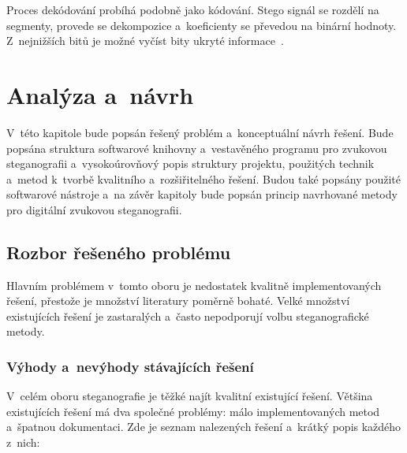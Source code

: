 Proces dekódování probíhá podobně jako kódování. Stego signál se rozdělí na
segmenty, provede se dekompozice a~koeficienty se převedou na binární hodnoty.
Z~nejnižších bitů je možné vyčíst bity ukryté informace~\cite{Pooyan2007}.


\chapter{Analýza a~návrh}
\label{cha:library-design}

V~této kapitole bude popsán řešený problém a~konceptuální návrh řešení. Bude
popsána struktura softwarové knihovny a~vestavěného programu pro zvukovou
steganografii a~vysokoúrovňový popis struktury projektu, použitých technik
a~metod k~tvorbě kvalitního a~rozšiřitelného řešení. Budou také popsány použité
softwarové nástroje a~na závěr kapitoly bude popsán princip navrhované metody
pro digitální zvukovou steganografii.

\section{Rozbor řešeného problému}
\label{sec:problem-analysis}

Hlavním problémem v~tomto oboru je nedostatek kvalitně implementovaných řešení,
přestože je množství literatury poměrně bohaté. Velké množství existujících
řešení je zastaralých a~často nepodporují volbu steganografické metody.





\subsection*{Výhody a~nevýhody stávajících řešení}
\label{sub:pros-cons-existing-solutions}

V~celém oboru steganografie je těžké najít kvalitní existující řešení. Většina
existujících řešení má dva společné problémy: málo implementovaných metod
a~špatnou dokumentaci. Zde je seznam nalezených řešení a~krátký popis každého
z~nich:

